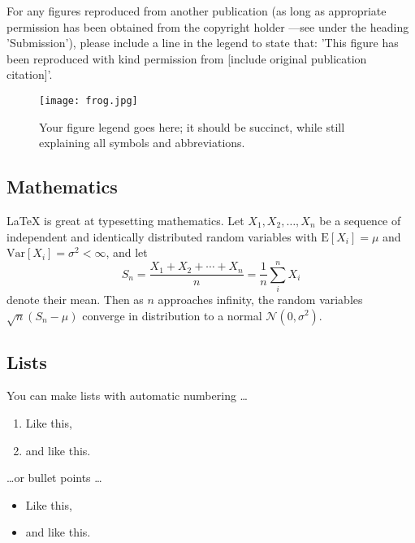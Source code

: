 \documentclass[9pt,a4paper]{extarticle}
\begin{document}
For any figures reproduced from another publication (as long as appropriate permission has been obtained from the copyright holder —see under the heading 'Submission'), please include a line in the legend to state that: 'This figure has been reproduced with kind permission from [include original publication citation]'.

\begin{figure}
\centering
\texttt{[image: frog.jpg]}
\caption{\label{fig:your-figure}Your figure legend goes here; it should be succinct, while still explaining all symbols and abbreviations. }
\end{figure}



\subsection*{Mathematics}

\LaTeX{} is great at typesetting mathematics. Let $X_1, X_2, \ldots, X_n$ be a sequence of independent and identically distributed random variables with $\text{E}[X_i] = \mu$ and $\text{Var}[X_i] = \sigma^2 < \infty$, and let
$$S_n = \frac{X_1 + X_2 + \cdots + X_n}{n}
      = \frac{1}{n}\sum_{i}^{n} X_i$$
denote their mean. Then as $n$ approaches infinity, the random variables $\sqrt{n}(S_n - \mu)$ converge in distribution to a normal $\mathcal{N}(0, \sigma^2)$.

\subsection*{Lists}

You can make lists with automatic numbering \dots

\begin{enumerate}
\item Like this,
\item and like this.
\end{enumerate}
\dots or bullet points \dots
\begin{itemize}
\item Like this,
\item and like this.
\end{itemize}






\end{document}
